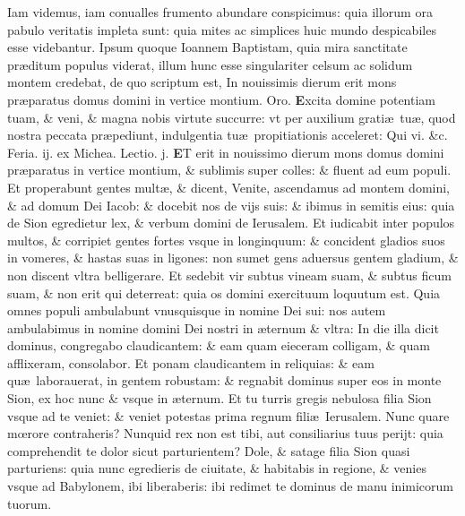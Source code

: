 \documentclass[a5paper,10pt]{book}
\def\leftmarginnote{%
	\lrmarginnote{\hskip -\marginparsep \hskip -6.5em}}
\def\ae{æ}
\def\oe{œ}
\begin{document}
\begin{multicols*}{2}
Iam videmus, iam conualles frumento abundare conspicimus: quia illorum ora pabulo veritatis impleta sunt: quia mites ac simplices huic mundo despicabiles esse videbantur.
Ipsum quoque Ioannem Baptistam, quia mira sanctitate pr\ae ditum populus viderat, illum hunc esse singulariter celsum ac solidum montem credebat, de quo scriptum est, In nouissimis dierum erit mons pr\ae paratus domus domini in vertice montium. \color{red} Oro. \color{black}
\vspace{-1.25em}
\lettrine[lines=2]{\bfseries \color{red} E}{}xcita domine potentiam tuam, \& veni, \& magna nobis virtute succurre: vt per auxilium grati\ae \ tu\ae , quod nostra peccata pr\ae pediunt, indulgentia tu\ae \ propitiationis acceleret: Qui vi. \&c.
\newline {} \color{red} \hypertarget{MON-QVARTA-ADV}{Feria. ij.} ex Michea. \hfill Lectio. j. \color{black}
\vspace{-.25em}
\lettrine[lines=2]{\bfseries E}{}T\leftmarginnote{\begin{flushright}ca. 4.\end{flushright}} erit in nouissimo dierum mons domus domini pr\ae paratus in vertice montium, \& sublimis super colles: \& fluent ad eum populi.
Et properabunt gentes mult\ae , \& dicent, Venite, ascendamus ad montem domini, \& ad domum Dei Iacob: \& docebit nos de vijs suis: \& ibimus in semitis eius: quia de Sion egredietur lex, \& verbum domini de Ierusalem.
Et iudicabit inter populos multos, \& corripiet gentes fortes vsque in longinquum: \& concident gladios suos in vomeres, \& hastas suas in ligones: non sumet gens aduersus gentem gladium, \& non discent vltra belligerare.
Et sedebit vir subtus vineam suam, \& subtus ficum suam, \& non erit qui deterreat: quia os domini exercituum loquutum est.
Quia omnes populi ambulabunt vnusquisque in nomine Dei sui: nos autem ambulabimus in nomine domini Dei nostri in \ae ternum \& vltra: In die illa dicit dominus, congregabo claudicantem: \& eam quam eieceram colligam, \& quam afflixeram, consolabor.
Et ponam claudicantem in reliquias: \& eam qu\ae \ laborauerat, in gentem robustam: \& regnabit dominus super eos in monte Sion, ex hoc nunc \& vsque in \ae ternum.
Et tu turris gregis nebulosa filia Sion vsque ad te veniet: \& veniet potestas
prima regnum fili\ae \ Ierusalem.
Nunc quare m\oe rore contraheris? Nunquid rex non est tibi, aut consiliarius tuus perijt: quia comprehendit te dolor sicut parturientem?
Dole, \& satage filia Sion quasi parturiens: quia nunc egredieris de ciuitate, \& habitabis in regione, \& venies vsque ad Babylonem, ibi liberaberis: ibi redimet te dominus de manu inimicorum tuorum.

\end{multicols*}
\end{document}
